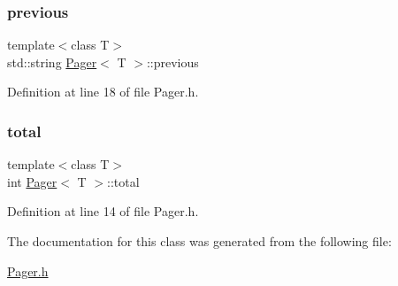 \subsubsection{\texorpdfstring{previous}{previous}}
{\footnotesize\ttfamily template$<$class T$>$ \\
std\+::string \mbox{\hyperlink{class_pager}{Pager}}$<$ T $>$\+::previous\hspace{0.3cm}{\ttfamily [private]}}



Definition at line 18 of file Pager.\+h.

\mbox{\label{class_pager_ac2ddd61004a9a04b595a2dbe7bd57193}} 
\subsubsection{\texorpdfstring{total}{total}}
{\footnotesize\ttfamily template$<$class T$>$ \\
int \mbox{\hyperlink{class_pager}{Pager}}$<$ T $>$\+::total\hspace{0.3cm}{\ttfamily [private]}}



Definition at line 14 of file Pager.\+h.



The documentation for this class was generated from the following file\+:\begin{DoxyCompactItemize}
\item 
\mbox{\hyperlink{_pager_8h}{Pager.\+h}}\end{DoxyCompactItemize}
